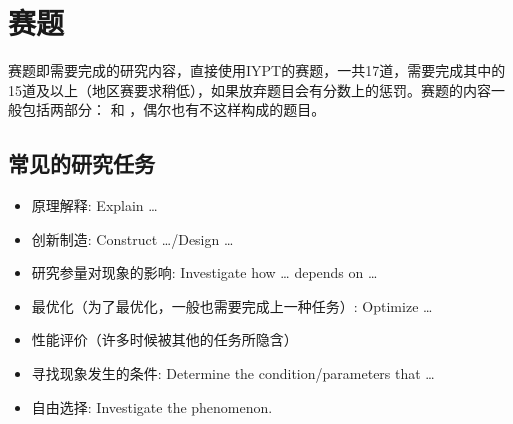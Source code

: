 \documentclass[a4paper,10pt,english]{sphinxmanual}
\begin{document}
\section{赛题}
\label{\detokenize{2. Intro_Tournament:id3}}
赛题即需要完成的研究内容，直接使用IYPT的赛题，一共17道，需要完成其中的15道及以上（地区赛要求稍低），如果放弃题目会有分数上的惩罚。赛题的内容一般包括两部分：  和  ，偶尔也有不这样构成的题目。


\subsection{常见的研究任务}
\label{\detokenize{2. Intro_Tournament:id4}}\begin{itemize}
\item {} 
原理解释: Explain …

\item {} 
创新制造: Construct …/Design …

\item {} 
研究参量对现象的影响: Investigate how … depends on …

\item {} 
最优化（为了最优化，一般也需要完成上一种任务）: Optimize …

\item {} 
性能评价（许多时候被其他的任务所隐含）

\item {} 
寻找现象发生的条件: Determine the condition/parameters that …

\item {} 
自由选择: Investigate the phenomenon.

\end{itemize}
\end{document}
